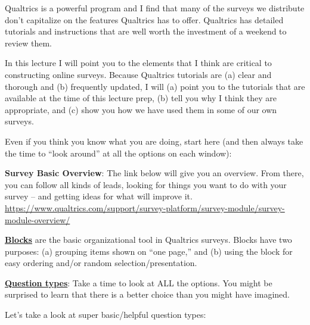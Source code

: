 \documentclass[
  english,
]{book}
\begin{document}
Qualtrics is a powerful program and I find that many of the surveys we distribute don't capitalize on the features Qualtrics has to offer. Qualtrics has detailed tutorials and instructions that are well worth the investment of a weekend to review them.

In this lecture I will point you to the elements that I think are critical to constructing online surveys. Because Qualtrics tutorials are (a) clear and thorough and (b) frequently updated, I will (a) point you to the tutorials that are available at the time of this lecture prep, (b) tell you why I think they are appropriate, and (c) show you how we have used them in some of our own surveys.

Even if you think you know what you are doing, start here (and then always take the time to ``look around'' at all the options on each window):

\textbf{Survey Basic Overview}: The link below will give you an overview. From there, you can follow all kinds of leads, looking for things you want to do with your survey -- and getting ideas for what will improve it.
\url{https://www.qualtrics.com/support/survey-platform/survey-module/survey-module-overview/}

\href{https://www.qualtrics.com/support/survey-platform/survey-module/block-options/block-options-overview/}{\textbf{Blocks}} are the basic organizational tool in Qualtrics surveys. Blocks have two purposes: (a) grouping items shown on ``one page,'' and (b) using the block for easy ordering and/or random selection/presentation.

\href{https://www.qualtrics.com/support/survey-platform/survey-module/editing-questions/question-types-guide/question-types-overview/}{\textbf{Question types}}: Take a time to look at ALL the options. You might be surprised to learn that there is a better choice than you might have imagined.

Let's take a look at super basic/helpful question types:
\end{document}
